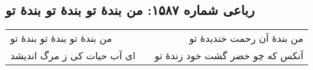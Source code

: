 \begin{center}
\section*{رباعی شماره ۱۵۸۷: من بندهٔ تو بندهٔ تو بندهٔ تو}
\label{sec:1587}
\begin{longtable}{l p{0.5cm} r}
من بندهٔ تو بندهٔ تو بندهٔ تو
&&
من بندهٔ آن رحمت خندیدهٔ تو
\\
ای آب حیات کی ز مرگ اندیشد
&&
آنکس که چو خضر گشت خود زندهٔ تو
\\
\end{longtable}
\end{center}
